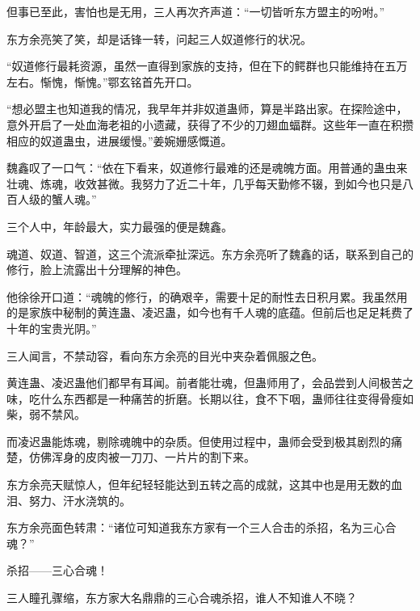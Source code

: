 \begin{this_body}
但事已至此，害怕也是无用，三人再次齐声道：“一切皆听东方盟主的吩咐。”

东方余亮笑了笑，却是话锋一转，问起三人奴道修行的状况。

“奴道修行最耗资源，虽然一直得到家族的支持，但在下的鳄群也只能维持在五万左右。惭愧，惭愧。”鄂玄铭首先开口。

“想必盟主也知道我的情况，我早年并非奴道蛊师，算是半路出家。在探险途中，意外开启了一处血海老祖的小遗藏，获得了不少的刀翅血蝠群。这些年一直在积攒相应的奴道蛊虫，进展缓慢。”姜婉姗感慨道。

魏鑫叹了一口气：“依在下看来，奴道修行最难的还是魂魄方面。用普通的蛊虫来壮魂、炼魂，收效甚微。我努力了近二十年，几乎每天勤修不辍，到如今也只是八百人级的蟹人魂。”

三个人中，年龄最大，实力最强的便是魏鑫。

魂道、奴道、智道，这三个流派牵扯深远。东方余亮听了魏鑫的话，联系到自己的修行，脸上流露出十分理解的神色。

他徐徐开口道：“魂魄的修行，的确艰辛，需要十足的耐性去日积月累。我虽然用的是家族中秘制的黄连蛊、凌迟蛊，如今也有千人魂的底蕴。但前后也足足耗费了十年的宝贵光阴。”

三人闻言，不禁动容，看向东方余亮的目光中夹杂着佩服之色。

黄连蛊、凌迟蛊他们都早有耳闻。前者能壮魂，但蛊师用了，会品尝到人间极苦之味，吃什么东西都是一种痛苦的折磨。长期以往，食不下咽，蛊师往往变得骨瘦如柴，弱不禁风。

而凌迟蛊能炼魂，剔除魂魄中的杂质。但使用过程中，蛊师会受到极其剧烈的痛楚，仿佛浑身的皮肉被一刀刀、一片片的割下来。

东方余亮天赋惊人，但年纪轻轻能达到五转之高的成就，这其中也是用无数的血泪、努力、汗水浇筑的。

东方余亮面色转肃：“诸位可知道我东方家有一个三人合击的杀招，名为三心合魂？”

杀招——三心合魂！

三人瞳孔骤缩，东方家大名鼎鼎的三心合魂杀招，谁人不知谁人不晓？

\end{this_body}

